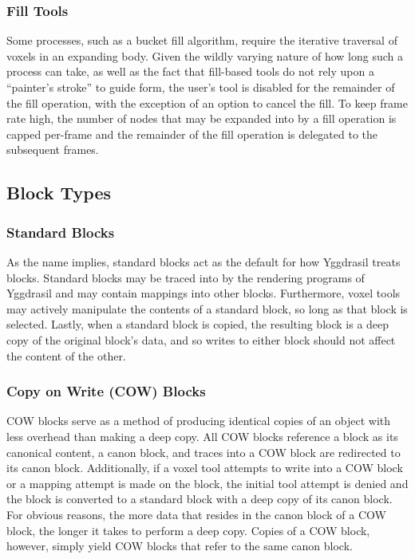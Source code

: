\documentclass[onecolumn, draftclsnofoot,10pt, compsoc]{IEEEtran}
\begin{document}
\subsubsection{Fill Tools}

Some processes, such as a bucket fill algorithm, require the iterative traversal of voxels in an expanding body. Given the wildly varying nature of how long such a process can take, as well as the fact that fill-based tools do not rely upon a “painter’s stroke” to guide form, the user’s tool is disabled for the remainder of the fill operation, with the exception of an option to cancel the fill. To keep frame rate high, the number of nodes that may be expanded into by a fill operation is capped per-frame and the remainder of the fill operation is delegated to the subsequent frames.


\subsection{Block Types}

\subsubsection{Standard Blocks}

As the name implies, standard blocks act as the default for how Yggdrasil treats blocks. Standard blocks may be traced into by the rendering programs of Yggdrasil and may contain mappings into other blocks. Furthermore, voxel tools may actively manipulate the contents of a standard block, so long as that block is selected. Lastly, when a standard block is copied, the resulting block is a deep copy of the original block’s data, and so writes to either block should not affect the content of the other.

\subsubsection{Copy on Write (COW) Blocks}

COW blocks serve as a method of producing identical copies of an object with less overhead than making a deep copy. All COW blocks reference a block as its canonical content, a canon block, and traces into a COW block are redirected to its canon block. Additionally, if a voxel tool attempts to write into a COW block or a mapping attempt is made on the block, the initial tool attempt is denied and the block is converted to a standard block with a deep copy of its canon block. For obvious reasons, the more data that resides in the canon block of a COW block, the longer it takes to perform a deep copy. Copies of a COW block, however, simply yield COW blocks that refer to the same canon block.
\end{document}
